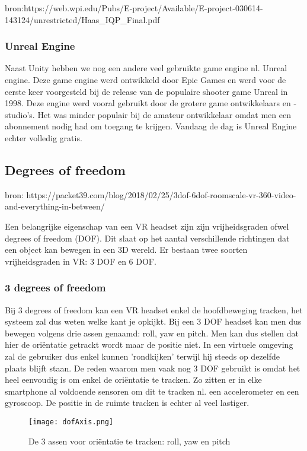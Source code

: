 bron:https://web.wpi.edu/Pubs/E-project/Available/E-project-030614-143124/unrestricted/Haas\_IQP\_Final.pdf

\subsubsection{Unreal Engine}
Naast Unity hebben we nog een andere veel gebruikte game engine nl. Unreal engine. Deze game engine werd ontwikkeld door Epic Games en werd voor de eerste keer voorgesteld bij de release van de populaire shooter game Unreal in 1998. Deze engine werd vooral gebruikt door de grotere game ontwikkelaars en -studio's. Het was minder populair bij de amateur ontwikkelaar omdat men een abonnement nodig had om toegang te krijgen. Vandaag de dag is Unreal Engine echter volledig gratis.

\subsection{Degrees of freedom}

bron: https://packet39.com/blog/2018/02/25/3dof-6dof-roomscale-vr-360-video-and-everything-in-between/

Een belangrijke eigenschap van een VR headset zijn zijn vrijheidsgraden ofwel degrees of freedom (DOF). Dit slaat op het aantal verschillende richtingen dat een object kan bewegen in een 3D wereld. Er bestaan twee soorten vrijheidsgraden in VR: 3 DOF en 6 DOF. 

\subsubsection{3 degrees of freedom}
Bij 3 degrees of freedom kan een VR headset enkel de hoofdbeweging tracken, het systeem zal dus weten welke kant je opkijkt. Bij een 3 DOF headset kan men dus bewegen volgens drie assen genaamd: roll, yaw en pitch. Men kan dus stellen dat hier de oriëntatie getrackt wordt maar de positie niet. In een virtuele omgeving zal de gebruiker dus enkel kunnen 'rondkijken' terwijl hij steeds op dezelfde plaats blijft staan. De reden waarom men vaak nog 3 DOF gebruikt is omdat het heel eenvoudig is om enkel de oriëntatie te tracken. Zo zitten er in elke smartphone al voldoende sensoren om dit te tracken nl. een accelerometer en een gyroscoop. De positie in de ruimte tracken is echter al veel lastiger.

\begin{figure}[h]
    \centering
    \texttt{[image: dofAxis.png]}
    \caption{De 3 assen voor oriëntatie te tracken: roll, yaw en pitch}
\end{figure}

